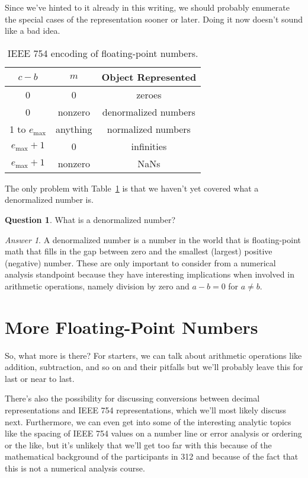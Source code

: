 \documentclass[letterpaper,12pt]{article}
\theoremstyle{remark}
\newtheorem*{ansa}{Answer}
\theoremstyle{definition}
\newtheorem*{quea}{Question}
\begin{document}
Since we've hinted to it already in this writing, we should probably
enumerate the special cases of the representation sooner or later.
Doing it now doesn't sound like a bad idea.
\begin{table}[h!]
  \begin{center}
    \begin{tabular}{|c|c|c|}
      \hline
      $c-b$ & $m$ & Object Represented\\
      \hline
      \hline
      0 & 0 & zeroes\\
      0 & nonzero & denormalized numbers\\
      1 to $e_{\mathrm{max}}$ & anything & normalized numbers\\
      $e_{\mathrm{max}}+1$ & 0 & infinities\\
      $e_{\mathrm{max}}+1$ & nonzero & NaNs\\
      \hline
    \end{tabular}
  \end{center}
  \caption{IEEE 754 encoding of floating-point numbers.}
  \label{special_cases}
\end{table}
The only problem with Table~\ref{special_cases} is that we haven't yet
covered what a denormalized number is.

\begin{quea}
  What is a denormalized number?
\end{quea}
\begin{ansa}
  A denormalized number is a number in the world that is
  floating-point math that fills in the gap between zero and the
  smallest (largest) positive (negative) number.  These are only
  important to consider from a numerical analysis standpoint because
  they have interesting implications when involved in arithmetic
  operations, namely division by zero and $a-b=0$ for $a\not =b$.
\end{ansa}

\section{More Floating-Point Numbers}

So, what more is there?  For starters, we can talk about arithmetic
operations like addition, subtraction, and so on and their pitfalls
but we'll probably leave this for last or near to last.

There's also the possibility for discussing conversions between
decimal representations and IEEE 754 representations, which we'll most
likely discuss next.  Furthermore, we can even get into some of the
interesting analytic topics like the spacing of IEEE 754 values on a
number line or error analysis or ordering or the like, but it's
unlikely that we'll get too far with this because of the mathematical
background of the participants in 312 and because of the fact that
this is not a numerical analysis course.
\end{document}
